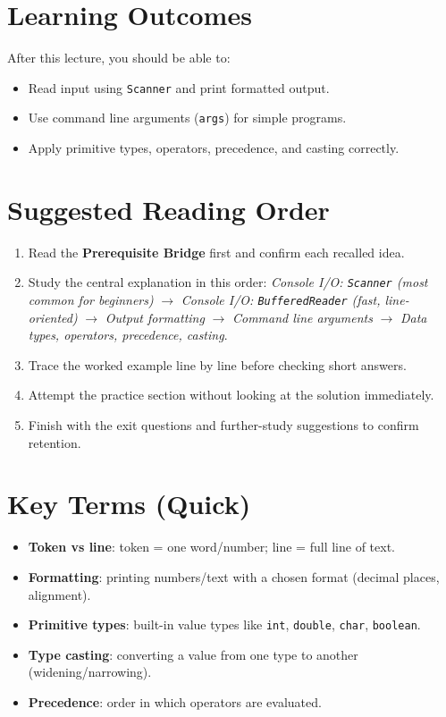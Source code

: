 \documentclass[11pt]{article}
\begin{document}
\section{Learning Outcomes}
After this lecture, you should be able to:
\begin{itemize}
  \item Read input using \texttt{Scanner} and print formatted output.
  \item Use command line arguments (\texttt{args}) for simple programs.
  \item Apply primitive types, operators, precedence, and casting correctly.
\end{itemize}

\section{Suggested Reading Order}
\begin{enumerate}
  \item Read the \textbf{Prerequisite Bridge} first and confirm each recalled idea.
  \item Study the central explanation in this order: \textit{Console I/O: \texttt{Scanner} (most common for beginners)} $\rightarrow$ \textit{Console I/O: \texttt{BufferedReader} (fast, line-oriented)} $\rightarrow$ \textit{Output formatting} $\rightarrow$ \textit{Command line arguments} $\rightarrow$ \textit{Data types, operators, precedence, casting}.
  \item Trace the worked example line by line before checking short answers.
  \item Attempt the practice section without looking at the solution immediately.
  \item Finish with the exit questions and further-study suggestions to confirm retention.
\end{enumerate}
\notesources{\OOPSUnitISources}

\section{Key Terms (Quick)}
\begin{itemize}
  \item \textbf{Token vs line}: token = one word/number; line = full line of text.
  \item \textbf{Formatting}: printing numbers/text with a chosen format (decimal places, alignment).
  \item \textbf{Primitive types}: built-in value types like \texttt{int}, \texttt{double}, \texttt{char}, \texttt{boolean}.
  \item \textbf{Type casting}: converting a value from one type to another (widening/narrowing).
  \item \textbf{Precedence}: order in which operators are evaluated.
\end{itemize}
\end{document}
